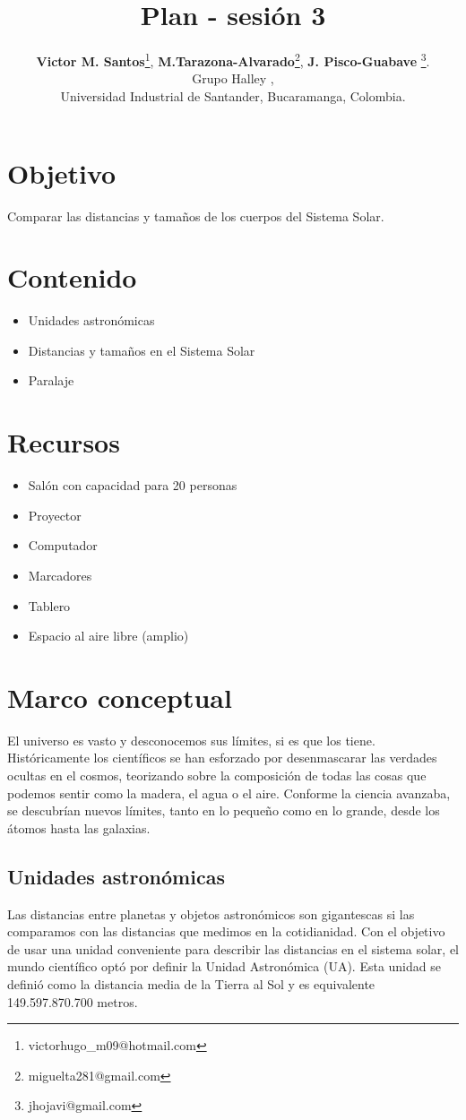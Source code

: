 \documentclass[10pt,a4paper]{article}
\title{Plan - sesión 3}
\author{\textbf{Victor M. Santos}\thanks{victorhugo\_m09@hotmail.com}, \textbf{M.Tarazona-Alvarado}\thanks{miguelta281@gmail.com}, \textbf{J. Pisco-Guabave} \thanks{jhojavi@gmail.com}. \\ Grupo Halley , \\ Universidad Industrial de Santander, Bucaramanga, Colombia.}
\date{ }
\begin{document}
\maketitle
\tableofcontents
\section{Objetivo}
Comparar las distancias y tamaños de los cuerpos del Sistema Solar.

\section{Contenido}
\begin{itemize}
\item Unidades astronómicas
\item Distancias y tamaños en el Sistema Solar
\item Paralaje
\end{itemize}


\section{Recursos}
\begin{itemize}
 \item Salón con capacidad para 20 personas
 \item Proyector
 \item Computador
 \item Marcadores
 \item Tablero
 \item Espacio al aire libre (amplio)
\end{itemize}

\section{Marco conceptual}
El universo es vasto y desconocemos sus límites, si es que los tiene. Históricamente los científicos se han esforzado por desenmascarar las verdades ocultas en el cosmos, teorizando sobre la composición de todas las cosas que podemos sentir como la madera, el agua o el aire. Conforme la ciencia avanzaba, se descubrían nuevos límites, tanto en lo pequeño como en lo grande, desde los átomos hasta las galaxias. 

\subsection{Unidades astronómicas}
Las distancias entre planetas y objetos astronómicos son gigantescas si las comparamos con las distancias que medimos en la cotidianidad. Con el objetivo de usar una unidad conveniente para describir las distancias en el sistema solar, el mundo científico optó por definir la Unidad Astronómica (UA). Esta unidad se definió como la distancia media de la Tierra al Sol y es equivalente 149.597.870.700 metros.
\end{document}
